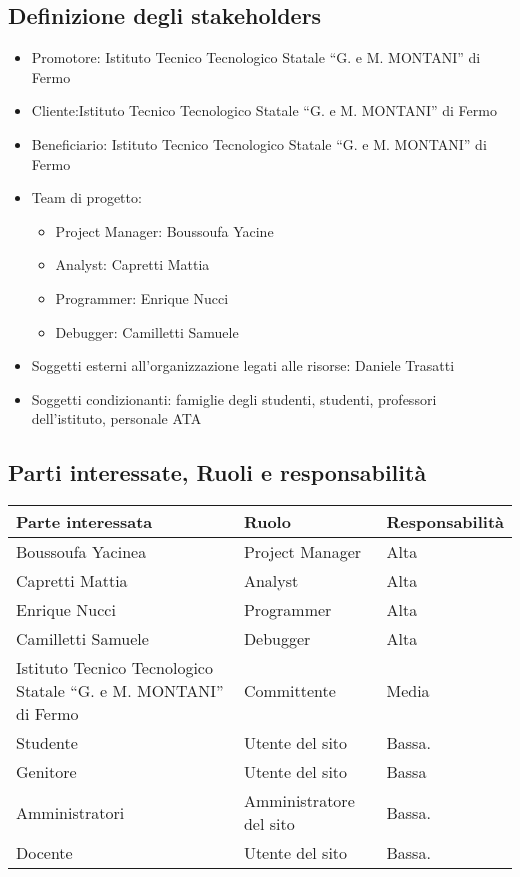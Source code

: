 \documentclass{article}
\begin{document}
\begin{flushleft}
		\subsection{Definizione degli stakeholders}
		\begin{itemize}
			\item Promotore: Istituto Tecnico Tecnologico Statale “G. e M. MONTANI” di Fermo
			\item Cliente:Istituto Tecnico Tecnologico Statale “G. e M. MONTANI” di Fermo
			\item Beneficiario: Istituto Tecnico Tecnologico Statale “G. e M. MONTANI” di Fermo
			\item Team di progetto:
			\begin{itemize}
				\item Project Manager: Boussoufa Yacine
				\item Analyst: Capretti Mattia
				\item Programmer: Enrique Nucci
				\item Debugger: Camilletti Samuele
			\end{itemize}
			\item Soggetti esterni all'organizzazione legati alle risorse: Daniele Trasatti
			\item Soggetti condizionanti: famiglie degli studenti, studenti, professori dell'istituto, personale ATA
		\end{itemize}
		\subsection{Parti interessate, Ruoli e responsabilità}
		\begin{tabular}{ |p{4cm}|p{4cm}|p{4cm}|  }
			\hline
			Parte interessata&Ruolo &Responsabilità\\
			\hline
			Boussoufa Yacinea&Project Manager&Alta\\
			\hline
			Capretti Mattia&Analyst&Alta\\
			\hline
			Enrique Nucci&Programmer&Alta\\
			\hline
			Camilletti Samuele&Debugger&Alta\\
			\hline
			Istituto Tecnico Tecnologico Statale “G. e M. MONTANI” di Fermo&Committente&Media\\
        	\hline
        	Studente   & Utente del sito & Bassa. \\
        	\hline
        	Genitore   & Utente del sito & Bassa
        	 \\
        	\hline
        	Amministratori  & Amministratore del sito & Bassa.\\	
        	\hline
        	Docente & Utente del sito & Bassa.\\
        	\hline
		\end{tabular}
		\vspace{3mm}

\end{flushleft}
\end{document}
